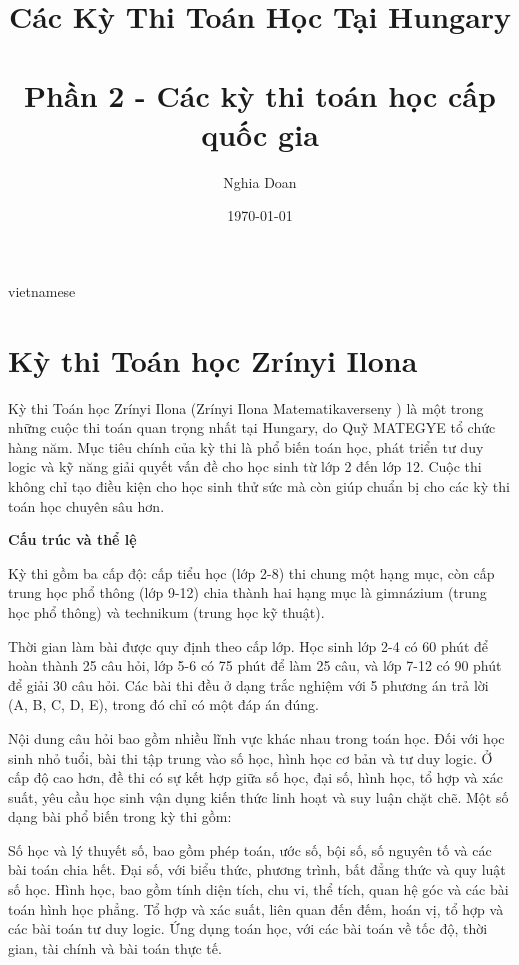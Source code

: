 \documentclass{article}
\title{Các Kỳ Thi Toán Học Tại Hungary\\ \quad \\Phần 2 - Các kỳ thi toán học cấp quốc gia}
\author{Nghia Doan}
\date{\today}
\begin{document}
\begin{otherlanguage*}{vietnamese}

\maketitle

\section{Kỳ thi Toán học Zrínyi Ilona}

Kỳ thi Toán học Zrínyi Ilona (Zrínyi Ilona Matematikaverseny \cite{Zrinyi}) là một trong những cuộc thi toán quan trọng nhất tại Hungary,
do Quỹ MATEGYE \cite{MATEGYE} tổ chức hàng năm.
Mục tiêu chính của kỳ thi là phổ biến toán học, phát triển tư duy logic và kỹ năng giải quyết vấn đề cho học sinh từ lớp 2 đến lớp 12.
Cuộc thi không chỉ tạo điều kiện cho học sinh thử sức mà còn giúp chuẩn bị cho các kỳ thi toán học chuyên sâu hơn.

\textbf{Cấu trúc và thể lệ}

Kỳ thi gồm ba cấp độ: cấp tiểu học (lớp 2-8) thi chung một hạng mục, còn cấp trung học phổ thông (lớp 9-12) chia thành hai hạng mục là gimnázium (trung học phổ thông)
và technikum (trung học kỹ thuật).

Thời gian làm bài được quy định theo cấp lớp. Học sinh lớp 2-4 có 60 phút để hoàn thành 25 câu hỏi, lớp 5-6 có 75 phút để làm 25 câu, và lớp 7-12 có 90 phút để giải 30 câu hỏi.
Các bài thi đều ở dạng trắc nghiệm với 5 phương án trả lời (A, B, C, D, E), trong đó chỉ có một đáp án đúng.

Nội dung câu hỏi bao gồm nhiều lĩnh vực khác nhau trong toán học. Đối với học sinh nhỏ tuổi, bài thi tập trung vào số học, hình học cơ bản và tư duy logic.
Ở cấp độ cao hơn, đề thi có sự kết hợp giữa số học, đại số, hình học, tổ hợp và xác suất, yêu cầu học sinh vận dụng kiến thức linh hoạt và suy luận chặt chẽ.
Một số dạng bài phổ biến trong kỳ thi gồm:
\begin{itemize}[topsep=0pt, partopsep=0pt, itemsep=0pt]
    \ii Số học và lý thuyết số, bao gồm phép toán, ước số, bội số, số nguyên tố và các bài toán chia hết.
    \ii Đại số, với biểu thức, phương trình, bất đẳng thức và quy luật số học.
    \ii Hình học, bao gồm tính diện tích, chu vi, thể tích, quan hệ góc và các bài toán hình học phẳng.
    \ii Tổ hợp và xác suất, liên quan đến đếm, hoán vị, tổ hợp và các bài toán tư duy logic.
    \ii Ứng dụng toán học, với các bài toán về tốc độ, thời gian, tài chính và bài toán thực tế.
\end{itemize}


\end{otherlanguage*}
\end{document}
